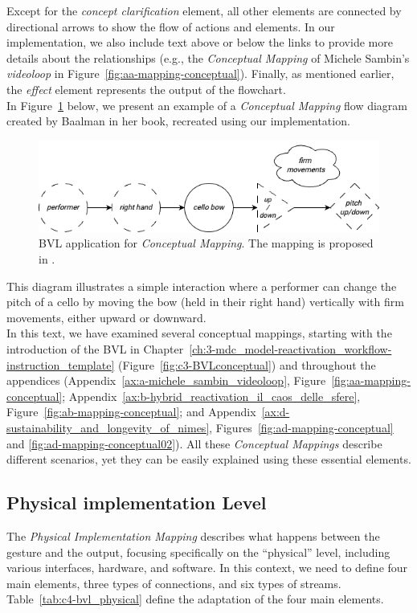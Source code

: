 Except for the \textit{concept clarification} element, all other elements are connected by directional arrows to show the flow of actions and elements. In our implementation, we also include text above or below the links to provide more details about the relationships (e.g., the \textit{Conceptual Mapping} of Michele Sambin’s \textit{videoloop} in Figure~\ref{fig:aa-mapping-conceptual}). Finally, as mentioned earlier, the \textit{effect} element represents the output of the flowchart.\\
In Figure~\ref{fig:c4-conceptual_level} below, we present an example of a \textit{Conceptual Mapping} flow diagram created by Baalman in her book, recreated using our implementation.

\begin{figure}[!h]
    \centering
    \includegraphics[width=1\linewidth]{chapters/4-MDC_model_application/image/bvl-conceptual_level.png}
    \caption{BVL application for \textit{Conceptual Mapping}. The mapping is proposed in \cite{baalman2022composing}.}
    \label{fig:c4-conceptual_level}
\end{figure}

This diagram illustrates a simple interaction where a performer can change the pitch of a cello by moving the bow (held in their right hand) vertically with firm movements, either upward or downward.\\
In this text, we have examined several conceptual mappings, starting with the introduction of the BVL in Chapter~\ref{ch:3-mdc_model-reactivation_workflow-instruction_template} (Figure~\ref{fig:c3-BVLconceptual}) and throughout the appendices (Appendix~\ref{ax:a-michele_sambin_videoloop}, Figure~\ref{fig:aa-mapping-conceptual}; Appendix~\ref{ax:b-hybrid_reactivation_il_caos_delle_sfere}, Figure~\ref{fig:ab-mapping-conceptual}; and Appendix~\ref{ax:d-sustainability_and_longevity_of_nimes}, Figures~\ref{fig:ad-mapping-conceptual} and \ref{fig:ad-mapping-conceptual02}). All these \textit{Conceptual Mappings} describe different scenarios, yet they can be easily explained using these essential elements.

\subsection{Physical implementation Level}
The \textit{Physical Implementation Mapping} describes what happens between the gesture and the output, focusing specifically on the ``physical'' level, including various interfaces, hardware, and software. In this context, we need to define four main elements, three types of connections, and six types of streams. Table~\ref{tab:c4-bvl_physical} define the adaptation of the four main elements.

